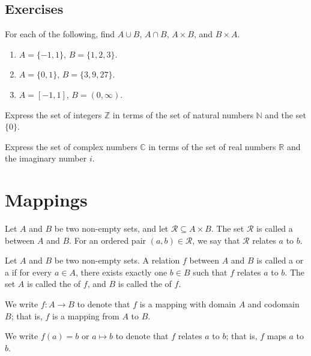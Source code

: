 \subsection*{Exercises}

\begin{exer}\label{exer:setops}
For each of the following, find $ A\cup B $, $ A\cap B $, $ A\times B $, and $ B\times A $.
\begin{enumerate}[label=(\alph*)]
    \item $ A=\{-1,1\} $, $ B=\{1,2,3\} $.
    \item $ A=\{0,1\} $, $ B=\{3,9,27\} $.
    \item $ A=[-1,1] $, $ B=(0,\infty) $.
\end{enumerate}
\end{exer}

\begin{exer}\label{exer:Z}
Express the set of integers $ \mathbb{Z} $ in terms of the set of natural numbers $ \mathbb{N} $ and the set $ \{0\} $.
\end{exer}

\begin{exer}\label{exer:C}
Express the set of complex numbers $ \mathbb{C} $ in terms of the set of real numbers $ \mathbb{R} $ and the imaginary number $ i $.
\end{exer}

\section{Mappings}

\begin{defn}
Let $ A $ and $ B $ be two non-empty sets, and let $ \mathcal{R}\subseteq A\times B $. The set $ \mathcal{R} $ is called a  between $ A $ and $ B $. For an ordered pair $ (a,b)\in\mathcal{R} $, we say that $ \mathcal{R} $ relates $ a $ to $ b $.
\end{defn}

\begin{defn}
Let $ A $ and $ B $ be two non-empty sets. A relation $ f $ between $ A $ and $ B $ is called a  or a  if for every $ a\in A $, there exists exactly one $ b\in B $ such that $ f $ relates $ a $ to $ b $. The set $ A $ is called the  of $ f $, and $ B $ is called the  of $ f $.

We write $ f:A\to B $ to denote that $ f $ is a mapping with domain $ A $ and codomain $ B $; that is, $ f $ is a mapping from $ A $ to $ B $.

We write $ f(a)=b $ or $ a\mapsto b $ to denote that $ f $ relates $ a $ to $ b $; that is, $ f $ maps $ a $ to $ b $.
\end{defn}

